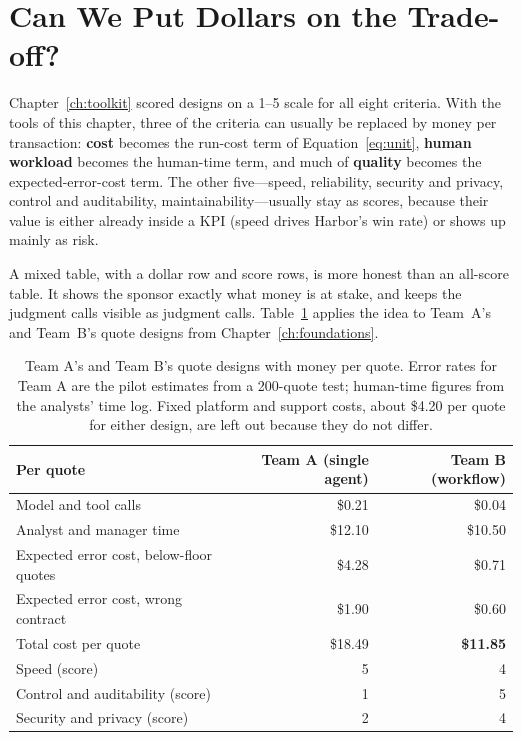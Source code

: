 
\section{Can We Put Dollars on the Trade-off?}
\label{sec:money-tradeoff}

Chapter~\ref{ch:toolkit} scored designs on a 1--5 scale for all eight criteria. With the tools of this chapter, three of the criteria can usually be replaced by money per transaction: \textbf{cost} becomes the run-cost term of Equation~\eqref{eq:unit}, \textbf{human workload} becomes the human-time term, and much of \textbf{quality} becomes the expected-error-cost term. The other five---speed, reliability, security and privacy, control and auditability, maintainability---usually stay as scores, because their value is either already inside a KPI (speed drives Harbor's win rate) or shows up mainly as risk.

A mixed table, with a dollar row and score rows, is more honest than an all-score table. It shows the sponsor exactly what money is at stake, and keeps the judgment calls visible as judgment calls. Table~\ref{tab:money} applies the idea to Team~A's and Team~B's quote designs from Chapter~\ref{ch:foundations}.

\begin{table}[htbp]
\centering
\small
\caption{Team A's and Team B's quote designs with money per quote. Error rates for Team A are the pilot estimates from a 200-quote test; human-time figures from the analysts' time log. Fixed platform and support costs, about \$4.20 per quote for either design, are left out because they do not differ.}
\label{tab:money}
\begin{tabular}{@{}lrr@{}}
\toprule
\rowcolor{coHead} Per quote & \cellcolor{coRedBg}Team A (single agent) & \cellcolor{coGreenBg}Team B (workflow) \\
\midrule
Model and tool calls & \$0.21 & \$0.04 \\
Analyst and manager time & \$12.10 & \$10.50 \\
Expected error cost, below-floor quotes & \$4.28 & \$0.71 \\
Expected error cost, wrong contract & \$1.90 & \$0.60 \\
\midrule
\rowcolor{coAmberBg} Total cost per quote & \$18.49 & \textbf{\$11.85} \\
\midrule
Speed (score) & 5 & 4 \\
Control and auditability (score) & 1 & 5 \\
Security and privacy (score) & 2 & 4 \\
\bottomrule
\end{tabular}
\end{table}

